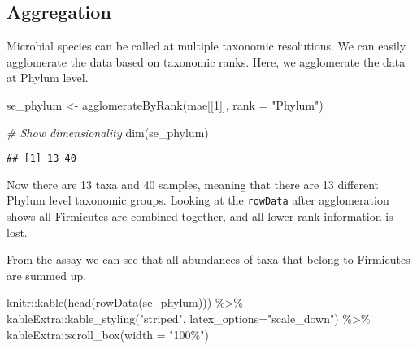 \documentclass[
  oneside]{book}
\newenvironment{Shaded}{\begin{snugshade}}{\end{snugshade}}
\newcommand{\AttributeTok}[1]{\textcolor[rgb]{0.77,0.63,0.00}{#1}}
\newcommand{\CommentTok}[1]{\textcolor[rgb]{0.56,0.35,0.01}{\textit{#1}}}
\newcommand{\DecValTok}[1]{\textcolor[rgb]{0.00,0.00,0.81}{#1}}
\newcommand{\FunctionTok}[1]{\textcolor[rgb]{0.00,0.00,0.00}{#1}}
\newcommand{\NormalTok}[1]{#1}
\newcommand{\OtherTok}[1]{\textcolor[rgb]{0.56,0.35,0.01}{#1}}
\newcommand{\SpecialCharTok}[1]{\textcolor[rgb]{0.00,0.00,0.00}{#1}}
\newcommand{\StringTok}[1]{\textcolor[rgb]{0.31,0.60,0.02}{#1}}
\begin{document}
\hypertarget{aggregation}{%
\subsection{Aggregation}\label{aggregation}}

Microbial species can be called at multiple taxonomic resolutions. We
can easily agglomerate the data based on taxonomic ranks. Here, we
agglomerate the data at Phylum level.

\begin{Shaded}
\begin{Highlighting}[]
\NormalTok{se\_phylum }\OtherTok{\textless{}{-}} \FunctionTok{agglomerateByRank}\NormalTok{(mae[[}\DecValTok{1}\NormalTok{]], }\AttributeTok{rank =} \StringTok{"Phylum"}\NormalTok{)}

\CommentTok{\# Show dimensionality}
\FunctionTok{dim}\NormalTok{(se\_phylum)}
\end{Highlighting}
\end{Shaded}

\begin{verbatim}
## [1] 13 40
\end{verbatim}

Now there are 13 taxa and 40
samples, meaning that there are 13 different
Phylum level taxonomic groups. Looking at the \texttt{rowData} after
agglomeration shows all Firmicutes are combined together, and all
lower rank information is lost.

From the assay we can see that all abundances of taxa that belong to
Firmicutes are summed up.

\begin{Shaded}
\begin{Highlighting}[]
\NormalTok{knitr}\SpecialCharTok{::}\FunctionTok{kable}\NormalTok{(}\FunctionTok{head}\NormalTok{(}\FunctionTok{rowData}\NormalTok{(se\_phylum))) }\SpecialCharTok{\%\textgreater{}\%} 
\NormalTok{  kableExtra}\SpecialCharTok{::}\FunctionTok{kable\_styling}\NormalTok{(}\StringTok{"striped"}\NormalTok{, }
                            \AttributeTok{latex\_options=}\StringTok{"scale\_down"}\NormalTok{) }\SpecialCharTok{\%\textgreater{}\%} 
\NormalTok{  kableExtra}\SpecialCharTok{::}\FunctionTok{scroll\_box}\NormalTok{(}\AttributeTok{width =} \StringTok{"100\%"}\NormalTok{)}
\end{Highlighting}
\end{Shaded}
\end{document}
